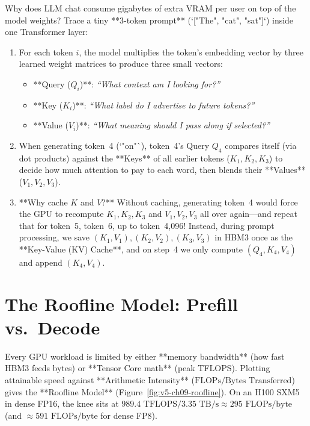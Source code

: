 Why does LLM chat consume gigabytes of extra VRAM per user on top of the model weights? Trace a tiny **3-token prompt** (`["The", "cat", "sat"]`) inside one Transformer layer:
\begin{enumerate}[leftmargin=18pt]
  \item For each token $i$, the model multiplies the token's embedding vector by three learned weight matrices to produce three small vectors:
  \begin{itemize}[leftmargin=14pt]
    \item **Query ($Q_i$)**: \textit{``What context am I looking for?''}
    \item **Key ($K_i$)**: \textit{``What label do I advertise to future tokens?''}
    \item **Value ($V_i$)**: \textit{``What meaning should I pass along if selected?''}
  \end{itemize}
  \item When generating token~4 (`"on"`), token~4's Query $Q_4$ compares itself (via dot products) against the **Keys** of all earlier tokens ($K_1, K_2, K_3$) to decide how much attention to pay to each word, then blends their **Values** ($V_1, V_2, V_3$).
  \item **Why cache $K$ and $V$?** Without caching, generating token~4 would force the GPU to recompute $K_1, K_2, K_3$ and $V_1, V_2, V_3$ all over again---and repeat that for token~5, token~6, up to token~4,096! Instead, during prompt processing, we save $(K_1, V_1), (K_2, V_2), (K_3, V_3)$ in HBM3 once as the **Key-Value (KV) Cache**, and on step~4 we only compute $(Q_4, K_4, V_4)$ and append $(K_4, V_4)$.
\end{enumerate}

\section{The Roofline Model: Prefill vs.\ Decode}

Every GPU workload is limited by either **memory bandwidth** (how fast HBM3 feeds bytes) or **Tensor Core math** (peak TFLOPS). Plotting attainable speed against **Arithmetic Intensity** ($\text{FLOPs} / \text{Bytes Transferred}$) gives the **Roofline Model** (Figure~\ref{fig:v5-ch09-roofline}). On an H100 SXM5 in dense FP16, the knee sits at $989.4\text{ TFLOPS} / 3.35\text{ TB/s} \approx 295\text{ FLOPs/byte}$ (and $\approx 591\text{ FLOPs/byte}$ for dense FP8).

